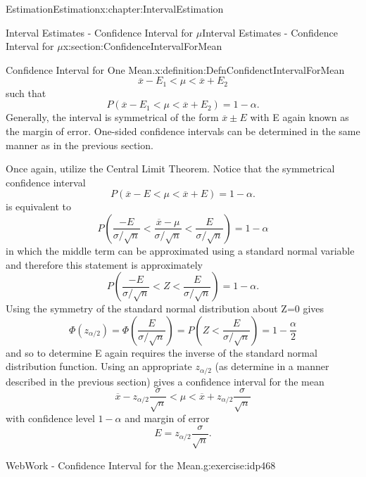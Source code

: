 \documentclass[oneside,10pt,]{book}
\numberwithin{equation}{section}
\newcommand{\lt}{<}
\begin{document}
\begin{chapterptx}{Estimation}{}{Estimation}{}{}{x:chapter:IntervalEstimation}
\begin{sectionptx}{Interval Estimates - Confidence Interval for \(\mu\)}{}{Interval Estimates - Confidence Interval for \(\mu\)}{}{}{x:section:ConfidenceIntervalForMean}
\begin{definition}{Confidence Interval for One Mean.}{x:definition:DefnConfidenctIntervalForMean}
\begin{equation*}
\overline{x} - E_1 \lt \mu \lt \overline{x} + E_2
\end{equation*}
such that%
\begin{equation*}
P(\overline{x} - E_1 \lt \mu \lt \overline{x} + E_2) = 1-\alpha.
\end{equation*}
Generally, the interval is symmetrical of the form \(\overline{x} \pm E\) with E again known as the margin of error.  One-sided confidence intervals can be determined in the same manner as in the previous section.%
\end{definition}
Once again, utilize the Central Limit Theorem.  Notice that the symmetrical confidence interval%
\begin{equation*}
P(\overline{x} - E \lt \mu \lt \overline{x} + E) = 1-\alpha.
\end{equation*}
is equivalent to%
\begin{equation*}
P \left ( \frac{-E}{\sigma / \sqrt{n}} \lt \frac{\overline{x} - \mu}{\sigma / \sqrt{n}} \lt \frac{E}{\sigma / \sqrt{n}} \right ) = 1 - \alpha
\end{equation*}
in which the middle term can be approximated using a standard normal variable and therefore this statement is approximately%
\begin{equation*}
P \left ( \frac{-E}{\sigma / \sqrt{n}} \lt Z \lt \frac{E}{\sigma / \sqrt{n}} \right ) = 1 - \alpha.
\end{equation*}
Using the symmetry of the standard normal distribution about Z=0 gives%
\begin{equation*}
\Phi (z_{\alpha/2} ) = \Phi \left ( \frac{E}{\sigma / \sqrt{n}} \right ) = P \left ( Z \lt \frac{E}{\sigma / \sqrt{n}} \right ) = 1 - \frac{\alpha}{2}
\end{equation*}
and so to determine E again requires the inverse of the standard normal distribution function.  Using an appropriate \(z_{\alpha /2}\) (as determine in a manner described in the previous section) gives a confidence interval for the mean%
\begin{equation*}
\overline{x} - z_{\alpha / 2} \frac{\sigma}{\sqrt{n}} \lt \mu \lt \overline{x} + z_{\alpha / 2} \frac{\sigma}{\sqrt{n}}
\end{equation*}
with confidence level \(1-\alpha\) and margin of error%
\begin{equation*}
E = z_{\alpha /2} \frac{\sigma}{\sqrt{n}}.
\end{equation*}
%
\begin{inlineexercise}{WebWork - Confidence Interval for the Mean.}{g:exercise:idp468}%

\end{inlineexercise}
\end{sectionptx}
\end{chapterptx}
\end{document}

